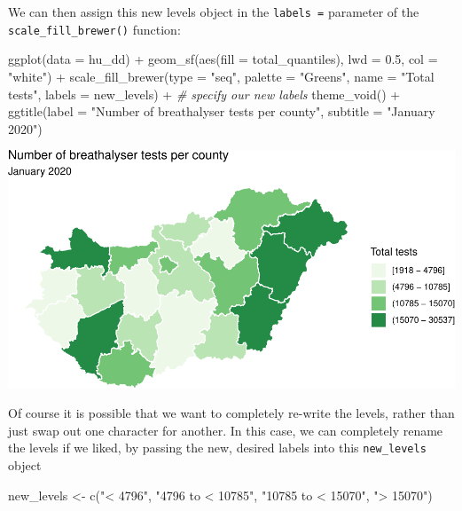 \documentclass[
]{book}
\makeatletter
\newenvironment{Shaded}{\begin{snugshade}}{\end{snugshade}}
\newcommand{\AttributeTok}[1]{\textcolor[rgb]{0.61,0.61,0.61}{#1}}
\newcommand{\CommentTok}[1]{\textcolor[rgb]{0.37,0.37,0.37}{\textit{#1}}}
\newcommand{\FloatTok}[1]{\textcolor[rgb]{0.06,0.06,0.06}{#1}}
\newcommand{\FunctionTok}[1]{\textcolor[rgb]{0,0,0}{#1}}
\newcommand{\NormalTok}[1]{#1}
\newcommand{\OtherTok}[1]{\textcolor[rgb]{0.37,0.37,0.37}{#1}}
\newcommand{\SpecialCharTok}[1]{\textcolor[rgb]{0,0,0}{#1}}
\newcommand{\StringTok}[1]{\textcolor[rgb]{0.5,0.5,0.5}{#1}}
\newenvironment{kframe}{%
\medskip{}
\setlength{\fboxsep}{.8em}
 \def\at@end@of@kframe{}%
 \ifinner\ifhmode%
  \def\at@end@of@kframe{\end{minipage}}%
  \begin{minipage}{\columnwidth}%
 \fi\fi%
 \def\FrameCommand##1{\hskip\@totalleftmargin \hskip-\fboxsep
 \colorbox{shadecolor}{##1}\hskip-\fboxsep
     \hskip-\linewidth \hskip-\@totalleftmargin \hskip\columnwidth}%
 \MakeFramed {\advance\hsize-\width
   \@totalleftmargin\z@ \linewidth\hsize
   \@setminipage}}%
 {\par\unskip\endMakeFramed%
 \at@end@of@kframe}
\renewenvironment{Shaded}{\begin{kframe}}{\end{kframe}}
\makeatother
\begin{document}
We can then assign this new levels object in the \texttt{labels\ =} parameter of the \texttt{scale\_fill\_brewer()} function:

\begin{Shaded}
\begin{Highlighting}[]
\FunctionTok{ggplot}\NormalTok{(}\AttributeTok{data =}\NormalTok{ hu\_dd) }\SpecialCharTok{+} 
  \FunctionTok{geom\_sf}\NormalTok{(}\FunctionTok{aes}\NormalTok{(}\AttributeTok{fill =}\NormalTok{ total\_quantiles), }
          \AttributeTok{lwd =} \FloatTok{0.5}\NormalTok{, }\AttributeTok{col =} \StringTok{"white"}\NormalTok{) }\SpecialCharTok{+} 
  \FunctionTok{scale\_fill\_brewer}\NormalTok{(}\AttributeTok{type =} \StringTok{"seq"}\NormalTok{, }\AttributeTok{palette =} \StringTok{"Greens"}\NormalTok{, }
                    \AttributeTok{name =} \StringTok{"Total tests"}\NormalTok{, }
                    \AttributeTok{labels =}\NormalTok{ new\_levels) }\SpecialCharTok{+}  \CommentTok{\# specify our new labels}
  \FunctionTok{theme\_void}\NormalTok{() }\SpecialCharTok{+} 
  \FunctionTok{ggtitle}\NormalTok{(}\AttributeTok{label =} \StringTok{"Number of breathalyser tests per county"}\NormalTok{, }
          \AttributeTok{subtitle =} \StringTok{"January 2020"}\NormalTok{)}
\end{Highlighting}
\end{Shaded}

\includegraphics{crime_mapping_files/figure-latex/legendlabelsplot-1.pdf}

Of course it is possible that we want to completely re-write the levels, rather than just swap out one character for another. In this case, we can completely rename the levels if we liked, by passing the new, desired labels into this \texttt{new\_levels} object

\begin{Shaded}
\begin{Highlighting}[]
\NormalTok{new\_levels }\OtherTok{\textless{}{-}} \FunctionTok{c}\NormalTok{(}\StringTok{"\textless{} 4796"}\NormalTok{, }\StringTok{"4796 to \textless{} 10785"}\NormalTok{, }\StringTok{"10785  to \textless{} 15070"}\NormalTok{, }\StringTok{"\textgreater{} 15070"}\NormalTok{)}
\end{Highlighting}
\end{Shaded}
\end{document}
